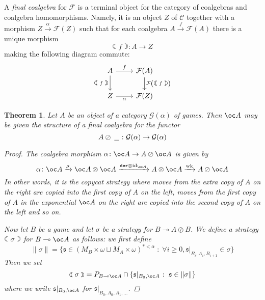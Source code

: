 \documentclass[11pt]{article} %
\theoremstyle{plain} %
\newtheorem{theorem}{Theorem}[section]
\theoremstyle{definition} %
\theoremstyle{note}
\theoremstyle{exercisestyle}
\newcommand{\map}[3]{#2\xrightarrow{#1} #3}
\newcommand*\from{\colon}
\DeclareMathOperator{\id}{id}
\newcommand{\tensor}{\otimes}
\newcommand{\sequoid}{\oslash}
\renewcommand{\implies}{\multimap}
\newcommand{\cprd}{\sqcup}
\newcommand{\G}{\mathcal G}
\newcommand{\suchthat}{\;\colon\;}
\newcommand{\F}{\mathcal F}
\newcommand{\s}{\mathfrak s}
\newcommand{\blank}{\;\underline{\hspace{1.5ex}}\;}
\newcommand{\C}{{\mathcal{C}}}
\newcommand{\der}{{\texttt{der}}}
\DeclareMathOperator{\wk}{wk}
\newcommand{\fcoal}[1]{{\leftmoon #1 \rightmoon}}
\begin{document}
A \emph{final coalgebra} for $\F$ is a terminal object for the category of coalgebras and coalgebra homomorphisms.  Namely, it is an object $Z$ of $\C$ together with a morphism $\map{\alpha}{Z}{\F(Z)}$ such that for each coalgebra $\map{f}{A}{\F(A)}$ there is a unique morphism
\[
  \fcoal{f}\from A \to Z
  \]
making the following diagram commute:
\[
  \begin{tikzcd}
    A \arrow[r, "f"] \arrow[d, "\fcoal{f}"']
      & \F(A) \arrow[d, "\F\left(\fcoal{f}\right)"] \\
    Z \arrow[r, "\alpha"']
      & \F(Z)
  \end{tikzcd}
  \]

\begin{theorem}
  Let $A$ be an object of a category $\G(\alpha)$ of games.  Then $\oc A$ may be given the structure of a final coalgebra for the functor
  \[
    A\sequoid\blank\from \G(\alpha)\to\G(\alpha)
    \]
  \begin{proof}
    The coalgebra morphism $\alpha\from \oc A\to A\sequoid\oc A$ is given by
    \[
      \alpha \from \oc A \xrightarrow{\mu} \oc A \tensor \oc A \xrightarrow{\der\tensor\id_{\oc A}} A\tensor\oc A\xrightarrow{\wk} A\sequoid\oc A
      \]
    In other words, it is the copycat strategy where moves from the extra copy of $A$ on the right are copied into the first copy of $A$ on the left, moves from the first copy of $A$ in the exponential $\oc A$ on the right are copied into the second copy of $A$ on the left and so on.  

    Now let $B$ be a game and let $\sigma$ be a strategy for $B\implies A\sequoid B$.  We define a strategy $\fcoal{\sigma}$ for $B\implies \oc A$ as follows: we first define
    \[
      \|\sigma\| = \{\s\in(M_B\times\omega\cprd M_A\times\omega)^{*<\alpha}\suchthat\forall i\ge 0, \s\vert_{B_i,A_i,B_{i+1}}\in\sigma\}
      \]
    Then we set
    \[
      \fcoal\sigma = P_{B\implies\oc A} \cap \{\s\vert_{B_0,\oc A}\suchthat\s\in\|\sigma\|\}
      \]
    where we write $\s\vert_{B_0, \oc A}$ for $\s\vert_{B_0,A_0,A_1,\dots}$.  


\end{proof}
\end{theorem}
\end{document}
